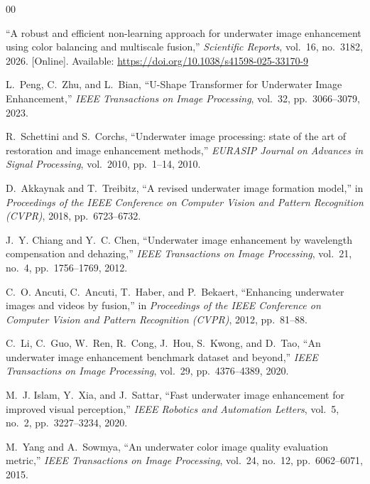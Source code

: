 \documentclass[conference]{IEEEtran}
\begin{document}
\begin{thebibliography}{00}

``A robust and efficient non-learning approach for underwater image enhancement using color balancing and multiscale fusion,'' \textit{Scientific Reports}, vol.~16, no.~3182, 2026. [Online]. Available: \url{https://doi.org/10.1038/s41598-025-33170-9}

L.~Peng, C.~Zhu, and L.~Bian, ``U-Shape Transformer for Underwater Image Enhancement,'' \textit{IEEE Transactions on Image Processing}, vol.~32, pp.~3066--3079, 2023.

R.~Schettini and S.~Corchs, ``Underwater image processing: state of the art of restoration and image enhancement methods,'' \textit{EURASIP Journal on Advances in Signal Processing}, vol.~2010, pp.~1--14, 2010.

D.~Akkaynak and T.~Treibitz, ``A revised underwater image formation model,'' in \textit{Proceedings of the IEEE Conference on Computer Vision and Pattern Recognition (CVPR)}, 2018, pp.~6723--6732.

J.~Y. Chiang and Y.~C. Chen, ``Underwater image enhancement by wavelength compensation and dehazing,'' \textit{IEEE Transactions on Image Processing}, vol.~21, no.~4, pp.~1756--1769, 2012.

C.~O. Ancuti, C.~Ancuti, T.~Haber, and P.~Bekaert, ``Enhancing underwater images and videos by fusion,'' in \textit{Proceedings of the IEEE Conference on Computer Vision and Pattern Recognition (CVPR)}, 2012, pp.~81--88.

C.~Li, C.~Guo, W.~Ren, R.~Cong, J.~Hou, S.~Kwong, and D.~Tao, ``An underwater image enhancement benchmark dataset and beyond,'' \textit{IEEE Transactions on Image Processing}, vol.~29, pp.~4376--4389, 2020.

M.~J. Islam, Y.~Xia, and J.~Sattar, ``Fast underwater image enhancement for improved visual perception,'' \textit{IEEE Robotics and Automation Letters}, vol.~5, no.~2, pp.~3227--3234, 2020.

M.~Yang and A.~Sowmya, ``An underwater color image quality evaluation metric,'' \textit{IEEE Transactions on Image Processing}, vol.~24, no.~12, pp.~6062--6071, 2015.

\end{thebibliography}
\end{document}
